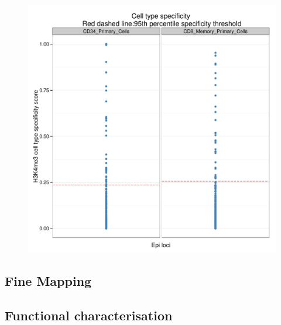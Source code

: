 \documentclass[paper=a4, fontsize=11pt]{scrartcl}	%
\numberwithin{equation}{section}									%
\numberwithin{figure}{section}										%
\numberwithin{table}{section}										%
\begin{document}
\begin{figure}[p]
	\centering
	\includegraphics[width=15cm]{images/EpiSNPs_cell_type_spec_for_top_tissues}
	\caption{}
	\label{fig:cor_8df}
\end{figure}


\subsection{Fine Mapping}

\subsection{Functional characterisation}


\clearpage




\end{document}
